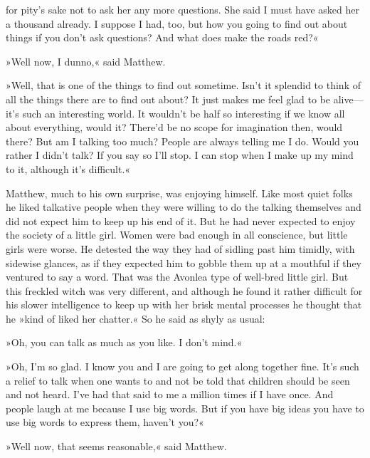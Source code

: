 for pity's sake not to ask her any more questions. She said I must have asked her a thousand already. I suppose I had, too, but how you going to find out about things if you don't ask questions? And what does make the roads red?«

»Well now, I dunno,« said Matthew.

»Well, that is one of the things to find out sometime. Isn't it splendid to think of all the things there are to find out about? It just makes me feel glad to be alive—it's such an interesting world. It wouldn't be half so interesting if we know all about everything, would it? There'd be no scope for imagination then, would there? But am I talking too much? People are always telling me I do. Would you rather I didn't talk? If you say so I'll stop. I can stop when I make up my mind to it, although it's difficult.«

Matthew, much to his own surprise, was enjoying himself. Like most quiet folks he liked talkative people when they were willing to do the talking themselves and did not expect him to keep up his end of it. But he had never expected to enjoy the society of a little girl. Women were bad enough in all conscience, but little girls were worse. He detested the way they had of sidling past him timidly, with sidewise glances, as if they expected him to gobble them up at a mouthful if they ventured to say a word. That was the Avonlea type of well-bred little girl. But this freckled witch was very different, and although he found it rather difficult for his slower intelligence to keep up with her brisk mental processes he thought that he »kind of liked her chatter.« So he said as shyly as usual:

»Oh, you can talk as much as you like. I don't mind.«

»Oh, I'm so glad. I know you and I are going to get along together fine. It's such a relief to talk when one wants to and not be told that children should be seen and not heard. I've had that said to me a million times if I have once. And people laugh at me because I use big words. But if you have big ideas you have to use big words to express them, haven't you?«

»Well now, that seems reasonable,« said Matthew.

